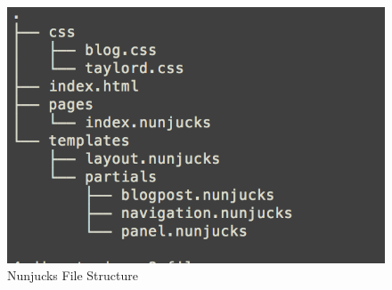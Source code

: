 \begin{figure}[h]
\caption{Nunjucks File Structure}
  \label{fig:structure}
\includegraphics{../public/images/fileStructure}
\centering
\end{figure}
%
%
%
%
%


